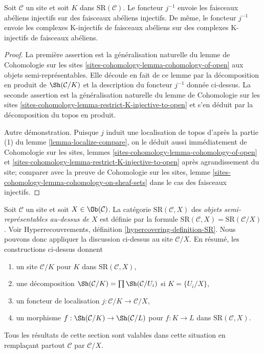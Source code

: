 \begin{lemma}
\label{lemma-localize-injective}
Soit $\mathcal{C}$ un site et soit $K$ dans $\text{SR}(\mathcal{C})$.
Le foncteur $j^{-1}$ envoie les faisceaux abéliens injectifs sur des faisceaux
abéliens injectifs. De même, le foncteur $j^{-1}$ envoie les complexes K-injectifs
de faisceaux abéliens sur des complexes K-injectifs de faisceaux
abéliens.
\end{lemma}

\begin{proof}
La première assertion est la généralisation naturelle du lemme
de Cohomologie sur les sites
\ref{sites-cohomology-lemma-cohomology-of-open}
aux objets semi-représentables.
Elle découle en fait de ce lemme
par la décomposition en produit de $\Sh(\mathcal{C}/K)$
et la description du foncteur $j^{-1}$ donnée ci-dessus.
La seconde assertion est la généralisation naturelle du lemme
de Cohomologie sur les sites
\ref{sites-cohomology-lemma-restrict-K-injective-to-open}
et s'en déduit par la décomposition du topos en produit.

\medskip\noindent
Autre démonstration. Puisque $j$ induit une localisation de topos d'après la
partie (1) du lemme \ref{lemma-localize-compare},
on le déduit aussi immédiatement de
Cohomologie sur les sites, lemmes \ref{sites-cohomology-lemma-cohomology-of-open}
et \ref{sites-cohomology-lemma-restrict-K-injective-to-open}
après agrandissement du site; comparer avec la preuve de
Cohomologie sur les sites, lemme
\ref{sites-cohomology-lemma-cohomology-on-sheaf-sets}
dans le cas des faisceaux injectifs.
\end{proof}

\begin{remark}
\label{remark-semi-representable-over-object}
Soit $\mathcal{C}$ un site et soit $X \in \Ob(\mathcal{C})$.
La catégorie $\text{SR}(\mathcal{C}, X)$
des {\it objets semi-représentables au-dessus de $X$}
est définie par la formule
$\text{SR}(\mathcal{C}, X) = \text{SR}(\mathcal{C}/X)$.
Voir Hyperrecouvrements, définition \ref{hypercovering-definition-SR}.
Nous pouvons donc appliquer la discussion ci-dessus au site
$\mathcal{C}/X$. En résumé, les constructions ci-dessus donnent
\begin{enumerate}
\item un site $\mathcal{C}/K$ pour $K$ dans $\text{SR}(\mathcal{C}, X)$,
\item une décomposition
$\Sh(\mathcal{C}/K) = \prod \Sh(\mathcal{C}/U_i)$ si $K = \{U_i/X\}$,
\item un foncteur de localisation $j : \mathcal{C}/K \to \mathcal{C}/X$,
\item un morphisme $f : \Sh(\mathcal{C}/K) \to \Sh(\mathcal{C}/L)$
pour $f : K \to L$ dans $\text{SR}(\mathcal{C}, X)$.
\end{enumerate}
Tous les résultats de cette section sont valables dans cette situation en remplaçant partout
$\mathcal{C}$ par $\mathcal{C}/X$.
\end{remark}

